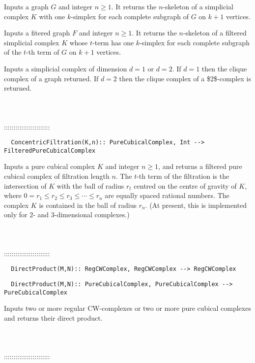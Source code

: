 \documentclass[a4paper,11pt]{report}
\begin{document}
{ 

 Inputs a graph $G$ and integer $n \ge 1$. It returns the $n$-skeleton of a simplicial complex $K$ with one $k$-simplex for each complete subgraph of $G$ on $k+1$ vertices. 

 Inputs a fitered graph $F$ and integer $n \ge 1$. It returns the $n$-skeleton of a filtered simplicial complex $K$ whose $t$-term has one $k$-simplex for each complete subgraph of the $t$-th term of $G$ on $k+1$ vertices. 

 Inputs a simplicial complex of dimension $d=1$ or $d=2$. If $d=1$ then the clique complex of a graph returned. If $d=2$ then the clique complex of a \$2\$-complex is returned. \\
 \\
 \\
 \\
 ::::::::::::::::::::::::\\
 
\begin{verbatim}  ConcentricFiltration(K,n):: PureCubicalComplex, Int --> FilteredPureCubicalComplex
\end{verbatim}


 

 Inputs a pure cubical complex $K$ and integer $n \ge 1$, and returns a filtered pure cubical complex of filtration length $n$. The $t$-th term of the filtration is the intersection of $K$ with the ball of radius $r_t$ centred on the centre of gravity of $K$, where $0=r_1 \le r_2 \le r_3 \le \cdots \le r_n$ are equally spaced rational numbers. The complex $K$ is contained in the ball of radius $r_n$. (At present, this is implemented only for $2$- and $3$-dimensional complexes.) \\
 \\
 \\
 \\
 ::::::::::::::::::::::::\\
 
\begin{verbatim}  DirectProduct(M,N):: RegCWComplex, RegCWComplex --> RegCWComplex
\end{verbatim}
 
\begin{verbatim}  DirectProduct(M,N):: PureCubicalComplex, PureCubicalComplex --> PureCubicalComplex
\end{verbatim}


 

 Inputs two or more regular CW-complexes or two or more pure cubical complexes
and returns their direct product. \\
 \\
 \\
 \\
 ::::::::::::::::::::::::\\
 
}
\end{document}
